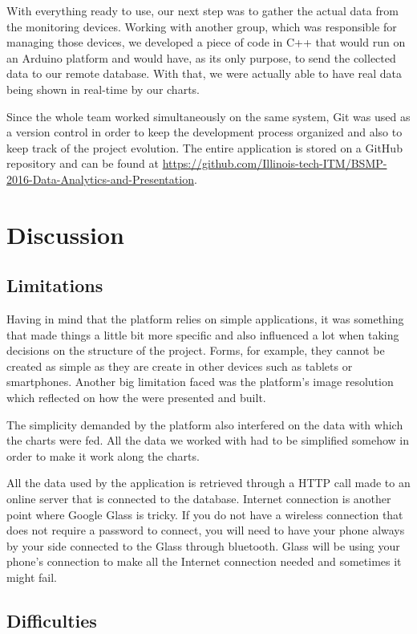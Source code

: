 \documentclass[a4paper,11pt]{article}
\begin{document}
With everything ready to use, our next step was to gather the actual data from the monitoring devices. Working with another group, which was responsible for managing those devices, we developed a piece of code in C++ that would run on an Arduino platform and would have, as its only purpose, to send the collected data to our remote database. With that, we were actually able to have real data being shown in real-time by our charts.

Since the whole team worked simultaneously on the same system, Git was used as a version control in order to keep the development process organized and also to keep track of the project evolution. The entire application is stored on a GitHub repository and can be found at \url{https://github.com/Illinois-tech-ITM/BSMP-2016-Data-Analytics-and-Presentation}.

\section{Discussion}
\subsection{Limitations}

Having in mind that the platform relies on simple applications, it was something that made things a little bit more specific and also influenced a lot when taking decisions on the structure of the project. Forms, for example, they cannot be created as simple as they are create in other devices such as tablets or smartphones. Another big limitation faced was the platform’s image resolution which reflected on how the were presented and built.

The simplicity demanded by the platform also interfered on the data with which the charts were fed. All the data we worked with had to be simplified somehow in order to make it work along the charts.

All the data used by the application is retrieved through a HTTP call made to an online server that is connected to the database. Internet connection is another point where Google Glass is tricky. If you do not have a wireless connection that does not require a password to connect, you will need to have your phone always by your side connected to the Glass through bluetooth. Glass will be using your phone’s connection to make all the Internet connection needed and sometimes it might fail.

\subsection{Difficulties}
\end{document}
